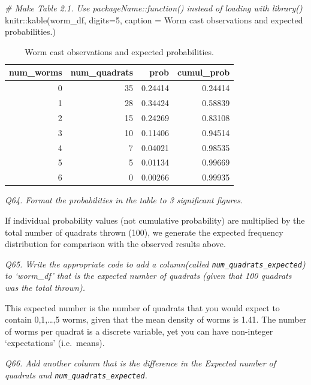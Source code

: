 \documentclass[
  11pt,
  a4paper,
]{book}
\newenvironment{Shaded}{\begin{snugshade}}{\end{snugshade}}
\newcommand{\AttributeTok}[1]{\textcolor[rgb]{0.77,0.63,0.00}{#1}}
\newcommand{\CommentTok}[1]{\textcolor[rgb]{0.56,0.35,0.01}{\textit{#1}}}
\newcommand{\DecValTok}[1]{\textcolor[rgb]{0.00,0.00,0.81}{#1}}
\newcommand{\FunctionTok}[1]{\textcolor[rgb]{0.00,0.00,0.00}{#1}}
\newcommand{\NormalTok}[1]{#1}
\newcommand{\SpecialCharTok}[1]{\textcolor[rgb]{0.00,0.00,0.00}{#1}}
\newcommand{\StringTok}[1]{\textcolor[rgb]{0.31,0.60,0.02}{#1}}
\begin{document}
\begin{Shaded}
\begin{Highlighting}[]
\CommentTok{\# Make Table 2.1. Use packageName::function() instead of loading with library()}
\NormalTok{knitr}\SpecialCharTok{::}\FunctionTok{kable}\NormalTok{(worm\_df, }\AttributeTok{digits=}\DecValTok{5}\NormalTok{,}
             \AttributeTok{caption =} \StringTok{\textquotesingle{}Worm cast observations and expected probabilities.\textquotesingle{}}\NormalTok{) }
\end{Highlighting}
\end{Shaded}

\begin{table}

\caption{\label{tab:worm-table}Worm cast observations and expected probabilities.}
\centering
\begin{tabular}[t]{r|r|r|r}
\hline
num\_worms & num\_quadrats & prob & cumul\_prob\\
\hline
0 & 35 & 0.24414 & 0.24414\\
\hline
1 & 28 & 0.34424 & 0.58839\\
\hline
2 & 15 & 0.24269 & 0.83108\\
\hline
3 & 10 & 0.11406 & 0.94514\\
\hline
4 & 7 & 0.04021 & 0.98535\\
\hline
5 & 5 & 0.01134 & 0.99669\\
\hline
6 & 0 & 0.00266 & 0.99935\\
\hline
\end{tabular}
\end{table}

\emph{Q64. Format the probabilities in the table to 3 significant figures.}

If individual probability values (not cumulative probability) are multiplied by the total number of quadrats thrown (100), we generate the expected frequency distribution for comparison with the observed results above.

\emph{Q65. Write the appropriate code to add a column(called \texttt{num\_quadrats\_expected}) to `worm\_df' that is the expected number of quadrats (given that 100 quadrats was the total thrown).}

This expected number is the number of quadrats that you would expect to contain 0,1,\ldots,5 worms, given that the mean density of worms is 1.41. The number of worms per quadrat is a discrete variable, yet you can have non-integer `expectations' (i.e.~means).

\emph{Q66. Add another column that is the difference in the Expected number of quadrats and \texttt{num\_quadrats\_expected}.}
\end{document}
